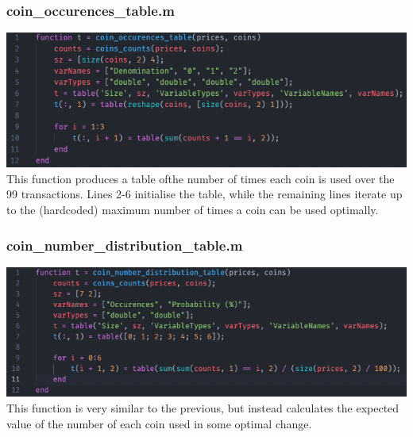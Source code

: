\documentclass{article}
\begin{document}
\subsubsection{coin\_occurences\_table.m}
\includegraphics[width=\textwidth]{task_1/coin_occurences_table.m..png}
\\
This function produces a table ofthe number of times each coin is used over the 99 transactions.
Lines 2-6 initialise the table, while the remaining lines iterate up to the (hardcoded) maximum number of times a coin can be used optimally.


\subsubsection{coin\_number\_distribution\_table.m}
\includegraphics[width=\textwidth]{task_1/coin_number_distribution_table.m.png}
This function is very similar to the previous, but instead calculates the expected value of the number of each coin used in some optimal change.
\end{document}
